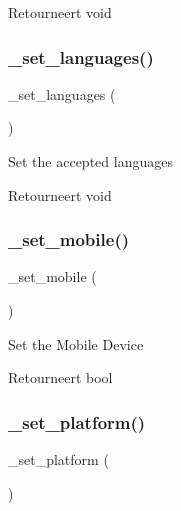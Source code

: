 \begin{DoxyReturn}{Retourneert}
void 
\end{DoxyReturn}
\mbox{\label{class_c_i___user__agent_a14307e07c78ada7733b36660bce03db8}} 
\subsubsection{\texorpdfstring{\_set\_languages()}{\_set\_languages()}}
{\footnotesize\ttfamily \+\_\+set\+\_\+languages (\begin{DoxyParamCaption}{ }\end{DoxyParamCaption})\hspace{0.3cm}{\ttfamily [protected]}}

Set the accepted languages

\begin{DoxyReturn}{Retourneert}
void 
\end{DoxyReturn}
\mbox{\label{class_c_i___user__agent_aa2b84face2c8bd1830f618bf9a57f196}} 
\subsubsection{\texorpdfstring{\_set\_mobile()}{\_set\_mobile()}}
{\footnotesize\ttfamily \+\_\+set\+\_\+mobile (\begin{DoxyParamCaption}{ }\end{DoxyParamCaption})\hspace{0.3cm}{\ttfamily [protected]}}

Set the Mobile Device

\begin{DoxyReturn}{Retourneert}
bool 
\end{DoxyReturn}
\mbox{\label{class_c_i___user__agent_a3e3af24bc0adb0483c3965765b28a25b}} 
\subsubsection{\texorpdfstring{\_set\_platform()}{\_set\_platform()}}
{\footnotesize\ttfamily \+\_\+set\+\_\+platform (\begin{DoxyParamCaption}{ }\end{DoxyParamCaption})\hspace{0.3cm}{\ttfamily [protected]}}

